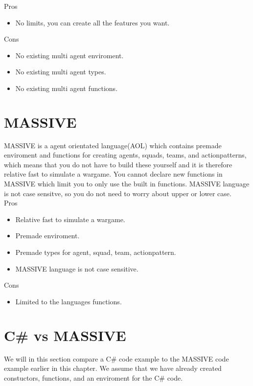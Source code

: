 Pros
\begin{itemize}
	\item No limits, you can create all the features you want.\\
\end{itemize}

Cons
\begin{itemize}
	\item No existing multi agent enviroment.
	\item No existing multi agent types.
	\item No existing multi agent functions.
\end{itemize}

\section{MASSIVE}
MASSIVE is a agent orientated language(AOL) which contains premade enviroment and functions for creating agents, squads, teams, and actionpatterns, which means that you do not have to build these yourself and it is therefore relative fast to simulate a wargame. You cannot declare new functions in MASSIVE which limit you to only use the built in functions. MASSIVE language is not case sensitve, so you do not need to worry about upper or lower case.\\

Pros
\begin{itemize}
	\item Relative fast to simulate a wargame.
  \item	Premade enviroment.
	\item Premade types for agent, squad, team, actionpattern.
	\item MASSIVE language is not case sensitive.
\end{itemize}

Cons
\begin{itemize}
	\item Limited to the languages functions.
\end{itemize}

\section{C\# vs MASSIVE}
We will in this section compare a C\# code example to the MASSIVE code example earlier in this chapter. We assume that we have already created constuctors, functions, and an enviroment for the C\# code.

